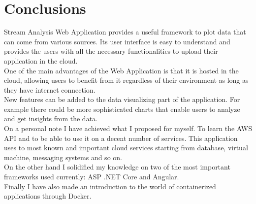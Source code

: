\chapter{Conclusions}
\label{chap:06}

Stream Analysis Web Application provides a useful framework to plot data that can come from various sources. Its user interface is easy to understand and provides the users with all the necessary functionalities to upload their application in the cloud.\\

One of the main advantages of the Web Application is that it is hosted in the cloud, allowing users to benefit from it regardless of their environment as long as they have internet connection.\\

New features can be added to the data visualizing part of the application. For example there could be more sophisticated charts that enable users to analyze and get insights from the data.\\

On a personal note I have achieved what I proposed for myself. To learn the AWS API and to be able to use it on a decent number of services. This application uses to most known and important cloud services starting from database, virtual machine, messaging systems and so on.\\

On the other hand I solidified my knowledge on two of the most important frameworks used currently: ASP .NET Core and Angular.\\

Finally I have also made an introduction to the world of containerized applications through Docker.